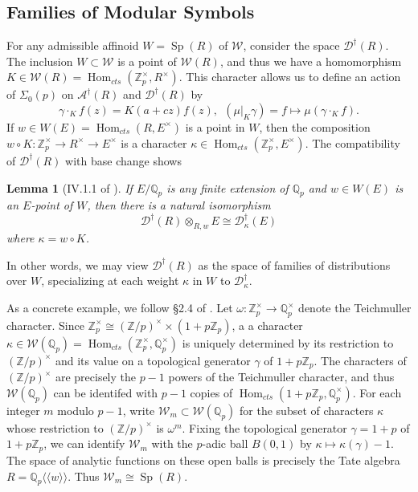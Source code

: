 \documentclass[10pt]{amsart}
\theoremstyle{plain}
\newtheorem{lemma}[theorem]{Lemma}
\theoremstyle{definition}
\newcommand{\ZZ}{{\mathbb{Z}}}
\newcommand{\QQ}{{\mathbb{Q}}}
\newcommand{\cA}{\mathcal{A}}
\newcommand{\cD}{\mathcal{D}}
\newcommand{\cW}{\mathcal{W}}
\DeclareMathOperator{\Hom}{Hom}
\DeclareMathOperator{\Sp}{Sp}
\begin{document}
\subsection{Families of Modular Symbols}
For any admissible affinoid $W=\Sp(R)$ of $\cW$, consider the space $\cD^\dagger(R)$. The inclusion $W\subset \cW$ is a point of $\cW(R)$, and thus we have a homomorphism $K\in \cW(R)=\Hom_{cts}(\ZZ_p^\times,R^\times)$. This character allows us to define an action of $\Sigma_0(p)$ on $\cA^\dagger(R)$ and $\cD^\dagger(R)$ by
\begin{equation}
	\gamma \cdot_K f(z) = K(a+cz) f(z), ~~ (\mu|_K\gamma)= f\mapsto \mu(\gamma\cdot_K f).
\end{equation}
If $w\in W(E)=\Hom_{cts}(R,E^\times)$ is a point in $W$, then the composition $w\circ K : \ZZ_p^\times\rightarrow R^\times\rightarrow E^\times$ is a character $\kappa\in \Hom_{cts}(\ZZ_p^\times,E^\times)$. The compatibility of $\cD^\dagger(R)$ with base change shows
\begin{lemma}[IV.1.1 of \cite{Bellaiche}]
If $E/\QQ_p$ is any finite extension of $\QQ_p$ and $w\in W(E)$ is an $E$-point of $W$, then there is a natural isomorphism
\begin{equation*}
	\cD^\dagger(R)\otimes_{R,w} E \cong \cD_\kappa^\dagger(E)
\end{equation*}
where $\kappa = w\circ K$.
\end{lemma}
In other words, we may view $\cD^\dagger(R)$ as the space of families of distributions over $W$, specializing at each weight $\kappa$ in $W$ to $\cD_\kappa^\dagger$.

As a concrete example, we follow \S2.4 of \cite{Robs}. Let $\omega:\ZZ_p^\times\rightarrow\QQ_p^\times$ denote the Teichmuller character. Since $\ZZ_p^\times\cong (\ZZ/p)^\times\times(1+p\ZZ_p)$, a a character $\kappa \in \cW(\QQ_p)=\Hom_{cts}(\ZZ_p^\times,\QQ_p^\times)$ is uniquely determined by its restriction to $(\ZZ/p)^\times$ and its value on a topological generator $\gamma$ of $1+p\ZZ_p$. The characters of $(\ZZ/p)^\times$ are precisely the $p-1$ powers of the Teichmuller character, and thus $\cW(\QQ_p)$ can be identifed with $p-1$ copies of $\Hom_{cts}(1+p\ZZ_p,\QQ_p^\times)$. For each integer $m$ modulo $p-1$, write $\cW_m\subset\cW(\QQ_p)$ for the subset of characters $\kappa$ whose restriction to $(\ZZ/p)^\times$ is $\omega^m$.  Fixing the topological generator $\gamma=1+p$ of $1+p\ZZ_p$, we can identify $\cW_m$ with the $p$-adic ball $B(0,1)$ by $\kappa \mapsto \kappa(\gamma)-1$. The space of analytic functions on these open balls is precisely the Tate algebra $R=\QQ_p\langle \langle w \rangle\rangle$. Thus $\cW_m \cong \Sp(R)$. 
\end{document}
